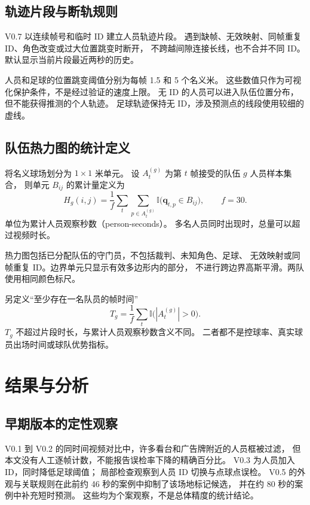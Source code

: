 \documentclass[UTF8,fontset=fandol,11pt,a4paper]{ctexart}
\begin{document}
\subsection{轨迹片段与断轨规则}
V0.7 以连续帧号和临时 ID 建立人员轨迹片段。
遇到缺帧、无效映射、同帧重复 ID、角色改变或过大位置跳变时断开，
不跨越间隙连接长线，也不合并不同 ID。
默认显示当前片段最近两秒的历史。

人员和足球的位置跳变阈值分别为每帧 1.5 和 5 个名义米。
这些数值只作为可视化保护条件，不是经过验证的速度上限。
无 ID 的人员可以进入队伍位置分布，但不能获得推测的个人轨迹。
足球轨迹保持无 ID，涉及预测点的线段使用较细的虚线。

\subsection{队伍热力图的统计定义}
将名义球场划分为 $1\times1$ 米单元。
设 $A_t^{(g)}$ 为第 $t$ 帧接受的队伍 $g$ 人员样本集合，
则单元 $B_{ij}$ 的累计量定义为
\begin{equation}
 H_g(i,j)=\frac1f\sum_t\sum_{p\in A_t^{(g)}}
           \mathbb{I}\bigl(\mathbf{q}_{t,p}\in B_{ij}\bigr),
 \qquad f=30.
\end{equation}
单位为累计人员观察秒数（person-seconds）。
多名人员同时出现时，总量可以超过视频时长。

热力图包括已分配队伍的守门员，不包括裁判、未知角色、足球、
无效映射或同帧重复 ID。边界单元只显示有效多边形内的部分，
不进行跨边界高斯平滑。两队使用相同颜色标尺。

另定义“至少存在一名队员的帧时间”
\begin{equation}
 T_g=\frac1f\sum_t\mathbb{I}\bigl(|A_t^{(g)}|>0\bigr).
\end{equation}
$T_g$ 不超过片段时长，与累计人员观察秒数含义不同。
二者都不是控球率、真实球员出场时间或球队优势指标。

\section{结果与分析}

\subsection{早期版本的定性观察}
V0.1 到 V0.2 的同时间视频对比中，许多看台和广告牌附近的人员框被过滤，
但本文没有人工逐帧计数，不能报告误检率下降的精确百分比。
V0.3 为人员加入 ID，同时降低足球阈值；
局部检查观察到人员 ID 切换与点球点误检。
V0.5 的外观与关联规则在此前约 46 秒的案例中抑制了该场地标记候选，
并在约 80 秒的案例中补充短时预测。
这些均为个案观察，不是总体精度的统计结论。
\end{document}
